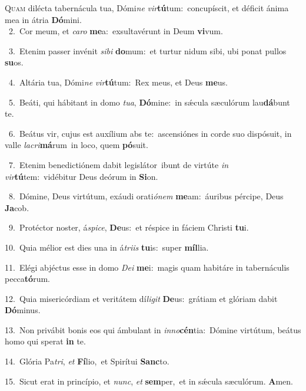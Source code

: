 \lettrine{\initial\textcolor{\initialcolor}{Q}}{uam} dilécta tabernácula tua, Dómi\textit{ne} \textit{vir}\-\textbf{tú}tum:~\star concupíscit, et déficit ánima mea in átria \textbf{Dó}\-mini.\\
{\numbfont\textcolor{\numbcolor}{~2.}}~Cor meum, et \textit{ca}\-\textit{ro} \textbf{me}\-a:~\star exsultavérunt in Deum \textbf{vi}\-vum.\par
{\numbfont\textcolor{\numbcolor}{~3.}}~Etenim passer invénit \textit{si}\-\textit{bi} \textbf{do}\-mum:~\star et turtur nidum sibi, ubi ponat pullos \textbf{su}\-os.\par
{\numbfont\textcolor{\numbcolor}{~4.}}~Altária tua, Dómi\textit{ne} \textit{vir}\-\textbf{tú}tum:~\star Rex meus, et Deus \textbf{me}\-us.\par
{\numbfont\textcolor{\numbcolor}{~5.}}~Beáti, qui hábitant in domo \textit{tu}\-\textit{a}, \textbf{Dó}\-mine:~\star in sǽcula sæculórum lau\-\textbf{dá}\-bunt te.\par
{\numbfont\textcolor{\numbcolor}{~6.}}~Beátus vir, cujus est auxílium abs te:~\dagger ascensiónes in corde suo dispósuit, in valle \textit{la}\-\textit{cri}\textbf{má}rum~\star in loco, quem \textbf{pó}\-suit.\par
{\numbfont\textcolor{\numbcolor}{~7.}}~Etenim benedictiónem dabit legislátor~\dagger ibunt de virtúte \textit{in} \textit{vir}\-\textbf{tú}tem:~\star vidébitur Deus deórum in \textbf{Si}\-on.\par
{\numbfont\textcolor{\numbcolor}{~8.}}~Dómine, Deus virtútum, exáudi orati\-\textit{ó}\-\textit{nem} \textbf{me}\-am:~\star áuribus pércipe, Deus \textbf{Ja}\-cob.\par
{\numbfont\textcolor{\numbcolor}{~9.}}~Protéctor noster, á\-\textit{spi}\-\textit{ce}, \textbf{De}\-us:~\star et réspice in fáciem Christi \textbf{tu}\-i.\par
{\numbfont\textcolor{\numbcolor}{10.}}~Quia mélior est dies una in á\-\textit{tri}\-\textit{is} \textbf{tu}\-is:~\star super \textbf{míl}\-lia.\par
{\numbfont\textcolor{\numbcolor}{11.}}~Elégi abjéctus esse in domo \textit{De}\-\textit{i} \textbf{me}\-i:~\star magis quam habitáre in tabernáculis pecca\-\textbf{tó}\-rum.\par
{\numbfont\textcolor{\numbcolor}{12.}}~Quia misericórdiam et veritátem dí\-\textit{li}\-\textit{git} \textbf{De}\-us:~\star grátiam et glóriam dabit \textbf{Dó}\-minus.\par
{\numbfont\textcolor{\numbcolor}{13.}}~Non privábit bonis eos qui ámbulant in \textit{in}\-\textit{no}\textbf{cén}tia:~\star Dómine virtútum, beátus homo qui sperat \textbf{in} te.\par
{\numbfont\textcolor{\numbcolor}{14.}}~Glória Pa\-\textit{tri}\-, \textit{et} \textbf{Fí}\-lio,~\star et Spirítui \textbf{Sanc}\-to.\par
{\numbfont\textcolor{\numbcolor}{15.}}~Sicut erat in princípio, et \textit{nunc}\-, \textit{et} \textbf{sem}\-per,~\star et in sǽcula sæculórum. \textbf{A}\-men.\par
